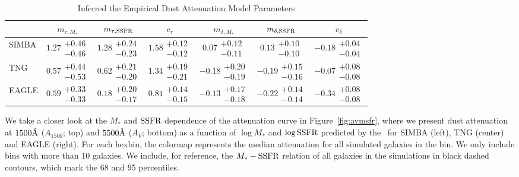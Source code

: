 \begin{table}
    \caption{Inferred the Empirical Dust Attenuation Model Parameters}
    \begin{tabular}{lcccccc} \toprule
        & $m_{\tau,M_*}$ & $m_{\tau,{\rm SSFR}}$ & $c_\tau$ & $m_{\delta,M_*}$ & $m_{\delta,{\rm SSFR}}$ & $c_\delta$ \\[3pt] \hline\hline
        SIMBA   & $1.27\substack{+0.46\\-0.46}$ &
        $1.28\substack{+0.24\\-0.23}$ & $1.58\substack{+0.12\\-0.12}$ &
        $0.07 \substack{+0.12\\-0.11}$ & $0.13 \substack{+0.10\\-0.10}$ &
        $-0.18\substack{+0.04\\-0.04}$ \\
        TNG     & $0.57\substack{+0.44\\-0.53}$ &
        $0.62\substack{+0.21\\-0.20}$ & $1.34\substack{+0.19\\-0.21}$ &
        $-0.18\substack{+0.20\\-0.19}$ & $-0.19\substack{+0.15\\-0.16}$ &
        $-0.07\substack{+0.08\\-0.08}$ \\
        EAGLE   & $0.59\substack{+0.33\\-0.33}$ &
        $0.18\substack{+0.20\\-0.17}$ & $0.81\substack{+0.14\\-0.15}$ &
        $-0.13\substack{+0.17\\-0.18}$ & $-0.22\substack{+0.14\\-0.14}$ &
        $-0.34\substack{+0.08\\-0.08}$\\
        \hline
    \end{tabular} \label{tab:posterior}
\end{table}

We take a closer look at the $M_*$ and ${\rm SSFR}$ dependence of the attenuation
curve in Figure~\ref{fig:avmsfr}, where we present dust attenuation at
$1500\AA$ ($A_{1500}$; top) and $5500\AA$
($A_V$; bottom) as a function of $\log M_*$ and $\log {\rm SSFR}$ predicted by the
\eda~for SIMBA (left), TNG (center) and EAGLE (right). 
For each hexbin, the colormap represents the median attenuation for all
simulated galaxies in the bin. 
We only include bins with more than 10 galaxies. 
We include, for reference, the $M_* - {\rm SSFR}$ relation of all galaxies in the
simulations in black dashed contours, which mark the 68 and 95 percentiles.

